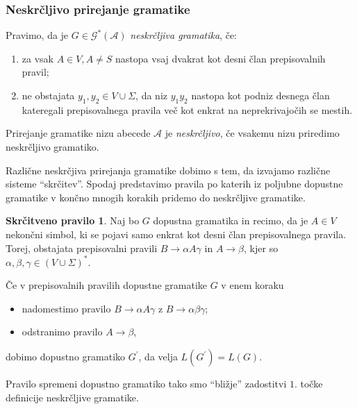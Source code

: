 \documentclass[fin1, tisk]{fmfdelo}
\newcommand{\A}{\mathcal{A}}
\newcommand{\G}{\mathcal{G}}
\theoremstyle{definition}
\newtheorem{pravilo}{Skrčitveno pravilo}
\begin{document}
\subsubsection{Neskrčljivo prirejanje gramatike}

\begin{definicija}
    Pravimo, da je $G \in \G^*(\A)$ \emph{neskrčljiva gramatika}, če:
    \begin{enumerate}
        \item za vsak $A \in V, A \neq S$ nastopa vsaj dvakrat kot desni član prepisovalnih pravil;
        \item ne obstajata $y_1,y_2 \in V \cup \Sigma$, da niz $y_1y_2$ nastopa kot podniz 
        desnega član kateregali prepisovalnega pravila več kot enkrat na neprekrivajočih se mestih. 
    \end{enumerate}
\end{definicija}

\begin{definicija}
    Prirejanje gramatike nizu abecede $\A$ je \textit{neskrčljivo}, če vsakemu nizu priredimo
    neskrčljivo gramatiko.
\end{definicija}

Različne neskrčjiva prirejanja gramatike dobimo s tem, da izvajamo različne sisteme ``skrčitev''.
Spodaj predstavimo pravila po katerih iz poljubne dopustne gramatike v končno mnogih korakih 
pridemo do neskrčljive gramatike.

\begin{pravilo}
    Naj bo $G$ dopustna gramatika in recimo, da je $A \in V$ nekončni simbol, ki se pojavi samo 
    enkrat kot desni član prepisovalnega pravila. Torej, obstajata prepisovalni pravili 
    $B \rightarrow \alpha A \gamma$ in $A \rightarrow \beta$, kjer so 
    $\alpha, \beta, \gamma \in (V \cup \Sigma)^*$.

    Če v prepisovalnih pravilih dopustne gramatike $G$ v enem koraku
    \begin{itemize}
        \item nadomestimo pravilo $B \rightarrow \alpha A \gamma$ z $B \rightarrow \alpha \beta \gamma$;
        \item odstranimo pravilo $ A \rightarrow \beta$,
    \end{itemize}
    dobimo dopustno gramatiko $G^\prime$, da velja $L(G^\prime) = L(G)$.

    Pravilo spremeni dopustno gramatiko tako smo ``bližje'' zadostitvi $1.$ točke definicije 
    neskrčljive gramatike.
\end{pravilo}
\end{document}
